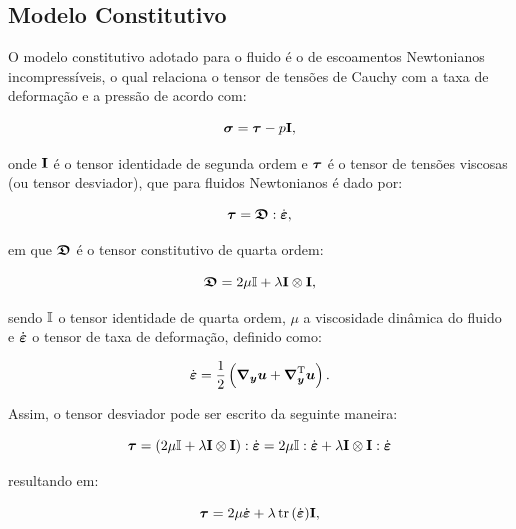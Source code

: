 \subsection{Modelo Constitutivo} \label{MC}

O modelo constitutivo adotado para o fluido é o de escoamentos Newtonianos incompressíveis, o qual relaciona o tensor de tensões de Cauchy com a taxa de deformação e a pressão de acordo com:

\begin{equation}
    \boldsymbol{\sigma}=\boldsymbol{\tau}-p\mathbf{I}\text{,}\label{eq:const1}
\end{equation}

\noindent onde $\mathbf{I}$ é o tensor identidade de segunda ordem e $\boldsymbol{\tau}$ é o tensor de tensões viscosas (ou tensor desviador), que para fluidos Newtonianos é dado por:

\begin{equation}
    \boldsymbol{\tau}=\boldsymbol{\mathfrak{D}}:\dot{\boldsymbol{\varepsilon}}\text{,}
\end{equation}

\noindent em que $\boldsymbol{\mathfrak{D}}$ é o tensor constitutivo de quarta ordem:

\begin{equation}
    \boldsymbol{\mathfrak{D}}=2\mu\boldsymbol{\mathbb{I}}+\lambda\mathbf{I}\otimes\mathbf{I}\text{,}
\end{equation}

\noindent sendo $\boldsymbol{\mathbb{I}}$ o tensor identidade de quarta ordem, $\mu$ a viscosidade dinâmica do fluido e $\dot{\boldsymbol{\varepsilon}}$ o tensor de taxa de deformação, definido como:

\begin{equation}
    \dot{\boldsymbol{\varepsilon}}=\frac{1}{2}\left({\boldsymbol{\nabla_y}\boldsymbol{u}+\boldsymbol{\nabla}^{\mathrm{T}}_{\boldsymbol{y}}\boldsymbol{u}}\right)\text{.}\label{eq:deftax1}
\end{equation}

Assim, o tensor desviador pode ser escrito da seguinte maneira:

\[
    \boldsymbol{\tau}=(2\mu\boldsymbol{\mathbb{I}}+\lambda\mathbf{I}\otimes\mathbf{I}):\dot{\boldsymbol{\varepsilon}}=2\mu\boldsymbol{\mathbb{I}}:\dot{\boldsymbol{\varepsilon}}+\lambda\mathbf{I}\otimes\mathbf{I}:\dot{\boldsymbol{\varepsilon}}
\]

\noindent resultando em:

\begin{equation}
    \boldsymbol{\tau}=2\mu\dot{\boldsymbol{\varepsilon}}+\lambda\mathop{\mathrm{tr}}\nolimits{(\dot{\boldsymbol{\varepsilon}})}\mathbf{I}\text{,}
\end{equation}

